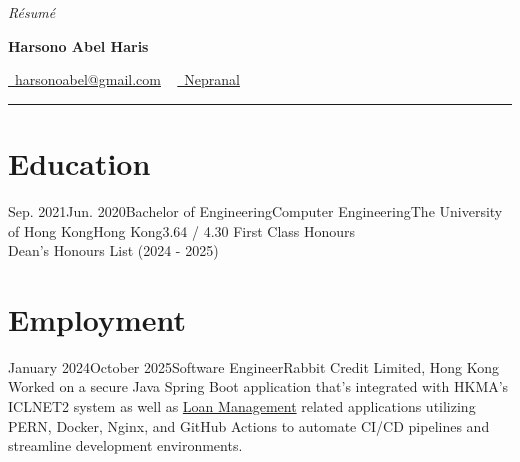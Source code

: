 \documentclass{cv}
\begin{document}
	\begin{center}
	    \textit{R\'esum\'e}\\
		{\Large \textbf{Harsono Abel Haris}\par}
		\href{mailto:harsonoabel@gmail.com}{\raisebox{-0.2\height}\faEnvelope\  harsonoabel@gmail.com} ~ 
        \href{https://github.com/Nepranal/notes}{\raisebox{-0.2\height}\faGithub\ Nepranal}
	\end{center}
	\vspace{-0.15in}
	\rule{\textwidth}{1pt}

%
%
%

	\section*{Education}
	\begin{education}{Sep. 2021}{Jun. 2020}{Bachelor of Engineering}{Computer Engineering}{The University of Hong Kong}{Hong Kong}{3.64 / 4.30}
	   First Class Honours\\
       Dean's Honours List (2024 - 2025)
	\end{education}

%
%
%
	
	\section*{Employment}
	\begin{employment}{January 2024}{October 2025}{Software Engineer}{Rabbit Credit Limited, Hong Kong}
        Worked on a secure Java Spring Boot application that's integrated with HKMA's ICLNET2 system as well as \href{https://github.com/Nepranal/notes/blob/main/Considerations%20In%20Building%20A%20Backend%20For%20Management%20Systems.md}{Loan Management} related applications utilizing PERN, Docker, Nginx, and GitHub Actions to automate CI/CD pipelines and streamline development environments.
	\end{employment}
\end{document}
